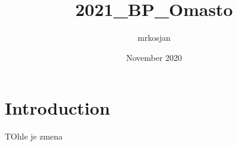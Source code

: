 \documentclass{article}
\title{2021_BP_Omasto}
\author{mrkosjan }
\date{November 2020}
\begin{document}
\maketitle

\section{Introduction}


    TOhle je zmena
\end{document}
